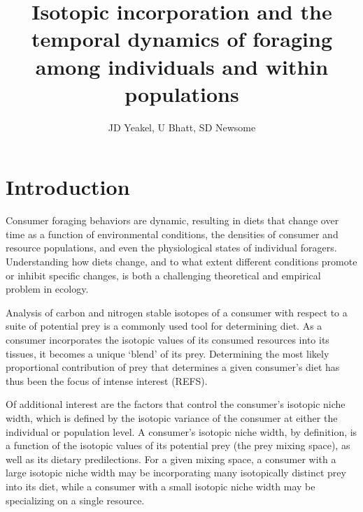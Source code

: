 \documentclass[11pt]{article}
\begin{document}
\title{Isotopic incorporation and the temporal dynamics of foraging among individuals and within populations}
\author{JD Yeakel, U Bhatt, SD Newsome}
\maketitle

\section{Introduction}

Consumer foraging behaviors are dynamic, resulting in diets that change over time as a function of environmental conditions, the densities of consumer and resource populations, and even the physiological states of individual foragers.
Understanding how diets change, and to what extent different conditions promote or inhibit specific changes, is both a challenging theoretical and empirical problem in ecology.

Analysis of carbon and nitrogen stable isotopes of a consumer with respect to a suite of potential prey is a commonly used tool for determining diet.
As a consumer incorporates the isotopic values of its consumed resources into its tissues, it becomes a unique `blend' of its prey.
Determining the most likely proportional contribution of prey that determines a given consumer's diet has thus been the focus of intense interest (REFS).

Of additional interest are the factors that control the consumer's isotopic niche width, which is defined by the isotopic variance of the consumer at either the individual or population level.
A consumer's isotopic niche width, by definition, is a function of the isotopic values of its potential prey (the prey mixing space), as well as its dietary predilections.
For a given mixing space, a consumer with a large isotopic niche width may be incorporating many isotopically distinct prey into its diet, while a consumer with a small isotopic niche width may be specializing on a single resource.





\end{document}
